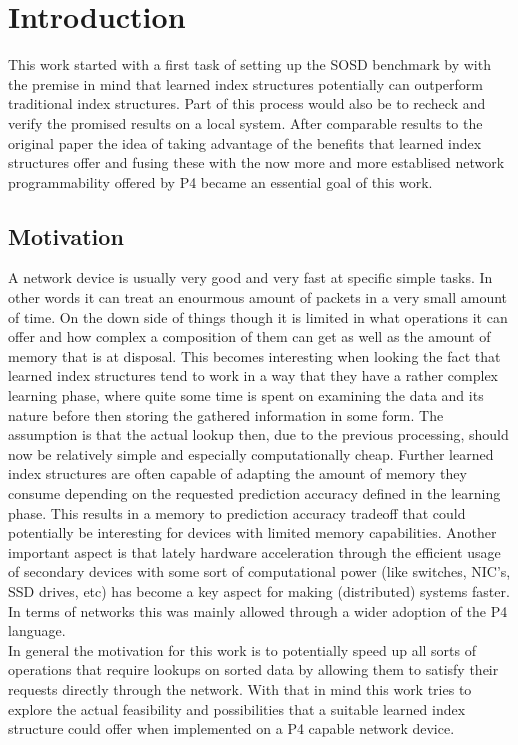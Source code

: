 
\chapter{Introduction}
\label{ch:introduction}
This work started with a first task of setting up the SOSD benchmark by \cite{sosd-neurips} with the premise in mind that learned index structures potentially can outperform traditional index structures. Part of this process would also be to recheck and verify the promised results on a local system. After comparable results to the original \cite{sosd-neurips} paper the idea of taking advantage of the benefits that learned index structures offer and fusing these with the now more and more establised network programmability offered by P4 became an essential goal of this work.

\section{Motivation}
A network device is usually very good and very fast at specific simple tasks. In other words it can treat an enourmous amount of packets in a very small amount of time. On the down side of things though it is limited in what operations it can offer and how complex a composition of them can get as well as the amount of memory that is at disposal. This becomes interesting when looking the fact that learned index structures tend to work in a way that they have a rather complex learning phase, where quite some time is spent on examining the data and its nature before then storing the gathered information in some form. The assumption is that the actual lookup then, due to the previous processing, should now be relatively simple and especially computationally cheap. Further learned index structures are often capable of adapting the amount of memory they consume depending on the requested prediction accuracy defined in the learning phase. This results in a memory to prediction accuracy tradeoff that could potentially be interesting for devices with limited memory capabilities. Another important aspect is that lately hardware acceleration through the efficient usage of secondary devices with some sort of computational power (like switches, NIC's, SSD drives, etc) has become a key aspect for making (distributed) systems faster. In terms of networks this was mainly allowed through a wider adoption of the P4 language.\\

In general the motivation for this work is to potentially speed up all sorts of operations that require lookups on sorted data by allowing them to satisfy their requests directly through the network. With that in mind this work tries to explore the actual feasibility and possibilities that a suitable learned index structure could offer when implemented on a P4 capable network device.\pagebreak


